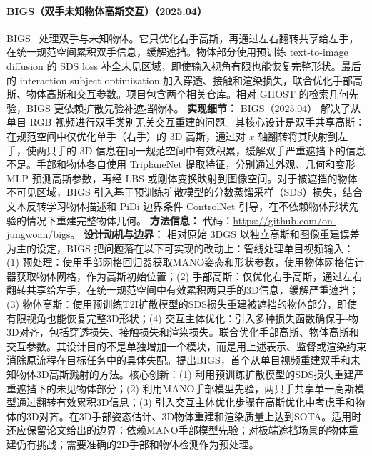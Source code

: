 \paragraph{BIGS（双手未知物体高斯交互）（2025.04）}
BIGS~\cite{2504_09097} 处理双手与未知物体。它只优化右手高斯，再通过左右翻转共享给左手，在统一规范空间累积双手信息，缓解遮挡。物体部分使用预训练 text-to-image diffusion 的 SDS loss 补全未见区域，即使输入视角有限也能恢复完整形状。最后的 interaction subject optimization 加入穿透、接触和渲染损失，联合优化手部高斯、物体高斯和交互参数。项目包含两个相关仓库。相对 GHOST 的检索几何先验，BIGS 更依赖扩散先验补遮挡物体。
\textbf{实现细节：} BIGS（2025.04） 解决了从单目 RGB 视频进行双手类别无关交互重建的问题。其核心设计是双手共享高斯：在规范空间中仅优化单手（右手）的 3D 高斯，通过对 $x$ 轴翻转将其映射到左手，使两只手的 3D 信息在同一规范空间中有效积累，缓解双手严重遮挡下的信息不足。手部和物体各自使用 TriplaneNet 提取特征，分别通过外观、几何和变形 MLP 预测高斯参数，再经 LBS 或刚体变换映射到图像空间。对于被遮挡的物体不可见区域，BIGS 引入基于预训练扩散模型的分数蒸馏采样（SDS）损失，结合文本反转学习物体描述和 PiDi 边界条件 ControlNet 引导，在不依赖物体形状先验的情况下重建完整物体几何。
\textbf{方法信息：} 代码：\url{https://github.com/on-jungwoan/bigs}。
\textbf{设计动机与边界：} 相对原始 3DGS 以独立高斯和图像重建误差为主的设定，BIGS 把问题落在以下可实现的改动上：管线处理单目视频输入：(1) 预处理：使用手部网格回归器获取MANO姿态和形状参数，使用物体网格估计器获取物体网格，作为高斯初始位置；(2) 手部高斯：仅优化右手高斯，通过左右翻转共享给左手，在统一规范空间中有效累积两只手的3D信息，缓解严重遮挡；(3) 物体高斯：使用预训练T2I扩散模型的SDS损失重建被遮挡的物体部分，即使有限视角也能恢复完整3D形状；(4) 交互主体优化：引入多种损失函数确保手-物3D对齐，包括穿透损失、接触损失和渲染损失。联合优化手部高斯、物体高斯和交互参数。其设计目的不是单独增加一个模块，而是用上述表示、监督或渲染约束消除原流程在目标任务中的具体失配。提出BIGS，首个从单目视频重建双手和未知物体3D高斯溅射的方法。核心创新：(1) 利用预训练扩散模型的SDS损失重建严重遮挡下的未见物体部分；(2) 利用MANO手部模型先验，两只手共享单一高斯模型通过翻转有效累积3D信息；(3) 引入交互主体优化步骤在高斯优化中考虑手和物体的3D对齐。在3D手部姿态估计、3D物体重建和渲染质量上达到SOTA。适用时还应保留论文给出的边界：依赖MANO手部模型先验；对极端遮挡场景的物体重建仍有挑战；需要准确的2D手部和物体检测作为预处理。
